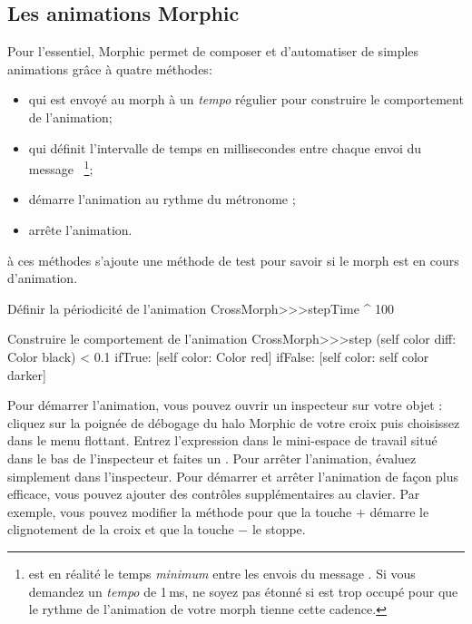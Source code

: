 \documentclass[a4paper,10pt,twoside]{book}
\begin{document}

\subsection{Les animations Morphic}

Pour l'essentiel, Morphic permet de composer et d'automatiser de
simples animations grâce à quatre méthodes:
\begin{itemize}
\item {} qui est envoyé au morph à un
  \emph{tempo} régulier pour construire le comportement de l'animation;
\item {} qui définit l'intervalle de temps en
  millisecondes entre chaque envoi du message ~\footnote{ est
    en réalité le temps \emph{minimum} entre les envois du message
    . Si vous demandez un \emph{tempo}  de
    1\,ms, ne soyez pas étonné si \pharo est trop occupé pour que
    le rythme de l'animation de votre morph tienne cette cadence.};
\item {} démarre l'animation au rythme
  du métronome ;
\item {} arrête l'animation.
\end{itemize}

à ces méthodes s'ajoute une méthode de test
 pour savoir si le morph est en cours
d'animation.%

\begin{method}{Définir la périodicité de l'animation}
CrossMorph>>>stepTime
	^ 100
\end{method}
\begin{method}{Construire le comportement de l'animation}
CrossMorph>>>step
	(self color diff: Color black) < 0.1
		ifTrue: [self color: Color red]
		ifFalse: [self color: self color darker]
\end{method}
\noindent
Pour démarrer l'animation, vous pouvez ouvrir un inspecteur sur
votre objet : cliquez sur la poignée de débogage 
\debugHandle{} du halo Morphic de votre croix 
 puis choisissez  dans le
menu flottant. Entrez l'expression  dans le
mini-espace de travail situé dans le bas de l'inspecteur et faites
un .
Pour arrêter l'animation, évaluez simplement  dans l'inspecteur. 
Pour démarrer et arrêter l'animation de façon plus efficace, vous pouvez
ajouter des contrôles supplémentaires au clavier. Par exemple,
vous pouvez modifier la méthode  pour que la
touche $+$ démarre le clignotement de la croix et que la touche $-$
le stoppe.
\end{document}
